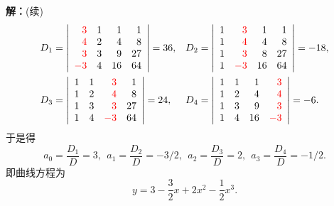 \begin{frame}
  \begin{footnotesize}
    \textbf{解：}(续)
    $$
    \begin{array}{ll}
      D_1 = \left|
      \begin{array}{rrrr}
        \textcolor{red}{3}  &  1 &  1 &  1\\
        \textcolor{red}{4}  &  2 &  4 &  8\\
        \textcolor{red}{3}  &  3 &  9 & 27\\
        \textcolor{red}{-3} &  4 & 16 & 64
      \end{array}
      \right|= 36, &
      D_2 = \left|
      \begin{array}{rrrr}
        1 & \textcolor{red}{3}  & 1  &  1\\
        1 & \textcolor{red}{4}  & 4  &  8\\
        1 & \textcolor{red}{3}  & 8  &  27\\
        1 & \textcolor{red}{-3} & 16 &  64
      \end{array}
      \right|=-18,\\[0.8cm]
      D_3 = \left|
      \begin{array}{rrrr}
        1 & 1 & \textcolor{red}{3}  &  1 \\
        1 & 2 & \textcolor{red}{4}  &  8 \\
        1 & 3 & \textcolor{red}{3}  & 27 \\
        1 & 4 & \textcolor{red}{-3} & 64
      \end{array}
      \right|= 24, &
      D_4 = \left|
      \begin{array}{rrrr}
        1 & 1 &  1 & \textcolor{red}{3} \\
        1 & 2 &  4 & \textcolor{red}{4} \\
        1 & 3 &  9 & \textcolor{red}{3} \\
        1 & 4 & 16 & \textcolor{red}{-3}
      \end{array}
      \right|= -6.
    \end{array}
    $$
    于是得
    $$
    a_0 = \frac{D_1}D = 3,  \ \ 
    a_1 = \frac{D_2}D = -3/2, \ \ 
    a_2 = \frac{D_3}D = 2, \ \ 
    a_3 = \frac{D_4}D = -1/2.
    $$
    即曲线方程为
    $$
    y = 3 - \frac 32 x + 2 x^2 - \frac 12 x^3.
    $$
  \end{footnotesize}
  
\end{frame}


